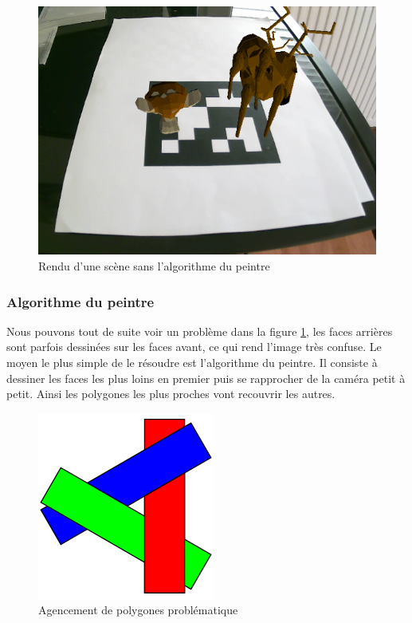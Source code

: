                 \begin{figure}[!h]
                    \centering
                    \includegraphics[scale=0.45]{img/rendu/sans_peintre.png}
                    \caption{Rendu d'une scène sans l'algorithme du peintre}
                    \label{fig:sans_peintre}
                \end{figure}
                
            \subsubsection{Algorithme du peintre}
                Nous pouvons tout de suite voir un problème dans la figure \ref{fig:sans_peintre}, les faces arrières sont parfois dessinées sur les faces avant, ce qui rend l'image très confuse. Le moyen le plus simple de le résoudre est l'algorithme du peintre. Il consiste à dessiner les faces les plus loins en premier puis se rapprocher de la caméra petit à petit. Ainsi les polygones les plus proches vont recouvrir les autres. 

                \begin{figure}[!h]
                    \centering
                    \includegraphics[scale=0.3]{img/rendu/peintre_probleme.png}
                    \caption{Agencement de polygones problématique}
                    \label{fig:peintre_probleme}
                \end{figure}

